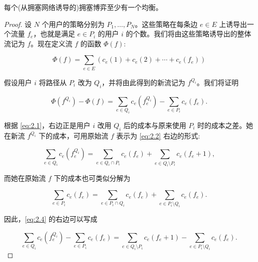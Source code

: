 \begin{theorem}\label{theo:2.2}每个(从拥塞网络诱导的)拥塞博弈至少有一个均衡。
\end{theorem}
\begin{proof}设 \(N\) 个用户的策略分别为 \({P}_{1},\ldots ,{P}_{N}\)。这些策略在每条边 \(e \in E\) 上诱导出一个流量 \({f}_{e}\)，也就是满足 \(e \in {P}_{i}\) 的用户 \(i\) 的个数。我们将由这些策略诱导出的整体流记为 \(f\)。现在定义流 \(f\) 的函数 \(\Phi \left( f\right)\):

\begin{equation}
\Phi \left( f\right)  = \sum_{{e \in  E}}\left( {{c}_{e}\left( 1\right)  + {c}_{e}\left( 2\right)  + \cdots  + {c}_{e}\left( {f}_{e}\right) }\right)\label{eq:2.3}
\end{equation}

假设用户 \(i\) 将路径从 \({P}_{i}\) 改为 \({Q}_{i}\)，并将由此得到的新流记为 \({f}^{{Q}_{i}}\)。我们将证明

\begin{equation}
\Phi \left( {f}^{{Q}_{i}}\right)  - \Phi \left( f\right)  = \sum_{{e \in  {Q}_{i}}}{c}_{e}\left( {f}_{e}^{{Q}_{i}}\right)  - \sum_{{e \in  {P}_{i}}}{c}_{e}\left( {f}_{e}\right) . \label{eq:2.4}
\end{equation}

根据 \eqref{eq:2.1}，右边正是用户 \(i\) 改用 \({Q}_{i}\) 后的成本与原来使用 \({P}_{i}\) 时的成本之差。她在新流 \({f}^{{Q}_{i}}\) 下的成本，可用原始流 \(f\) 表示为 \eqref{eq:2.2} 右边的形式:

\begin{equation}
\sum_{{e \in  {Q}_{i}}}{c}_{e}\left( {f}_{e}^{{Q}_{i}}\right)  = \sum_{{e \in  {Q}_{i} \cap  {P}_{i}}}{c}_{e}\left( {f}_{e}\right)  + \sum_{{e \in  {Q}_{i} \setminus  {P}_{i}}}{c}_{e}\left( {{f}_{e} + 1}\right) , \label{eq:2.5}
\end{equation}

而她在原始流 \(f\) 下的成本也可类似分解为

\begin{equation}
\sum_{{e \in  {P}_{i}}}{c}_{e}\left( {f}_{e}\right)  = \sum_{{e \in  {P}_{i} \cap  {Q}_{i}}}{c}_{e}\left( {f}_{e}\right)  + \sum_{{e \in  {P}_{i} \setminus  {Q}_{i}}}{c}_{e}\left( {f}_{e}\right) . \label{eq:2.6}
\end{equation}

因此，\eqref{eq:2.4} 的右边可以写成

\begin{equation}
\sum_{{e \in  {Q}_{i}}}{c}_{e}\left( {f}_{e}^{{Q}_{i}}\right)  - \sum_{{e \in  {P}_{i}}}{c}_{e}\left( {f}_{e}\right)  = \sum_{{e \in  {Q}_{i} \setminus  {P}_{i}}}{c}_{e}\left( {{f}_{e} + 1}\right)  - \sum_{{e \in  {P}_{i} \setminus  {Q}_{i}}}{c}_{e}\left( {f}_{e}\right) . \label{eq:2.7}
\end{equation}


\end{proof}
